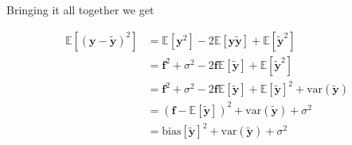 \documentclass[twoside,11pt]{report}
\begin{document}
\begin{center}
 Bringing it all together we get 
\end{center}
\begin{align*}
\mathbb{E}\left[(\mathbf{y}-\mathbf{\tilde{y}})^2\right] & = \mathbb{E}[\mathbf{y}^2] - 2\mathbb{E}[\mathbf{y\tilde{y}}] + \mathbb{E}[\mathbf{\tilde{y}}^2]\\
& = \mathbf{f}^2 + \sigma^2 - 2\mathbf{f}\mathbb{E}[\mathbf{\tilde{y}}] + \mathbb{E}[\mathbf{\tilde{y}}^2]\\
& = \mathbf{f}^2 + \sigma^2 - 2\mathbf{f}\mathbb{E}[\mathbf{\tilde{y}}] + \mathbb{E}[\mathbf{\tilde{y}}]^2 + \text{var}(\mathbf{\tilde{y}})\\
& = (\mathbf{f} - \mathbb{E}[\mathbf{\tilde{y}}])^2 + \text{var}(\mathbf{\tilde{y}}) + \sigma^2\\
& = \text{bias}[\mathbf{\tilde{y}}]^2 + \text{var}(\mathbf{\tilde{y}}) + \sigma^2
\end{align*}
\end{document}
